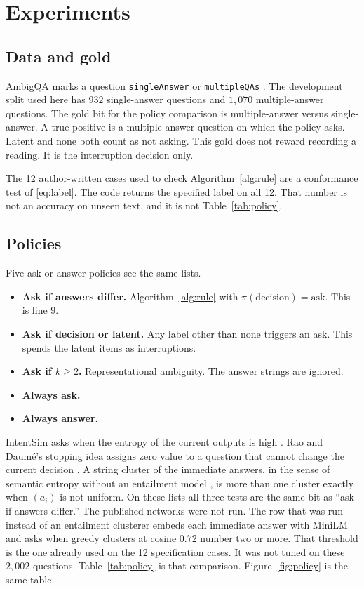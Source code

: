 \documentclass[journal]{IEEEtran}
\begin{document}
\section{Experiments}
\label{sec:eval}

\subsection{Data and gold}
AmbigQA marks a question \texttt{singleAnswer} or \texttt{multipleQAs} \cite{min-etal-2020-ambigqa}.
The development split used here has $932$ single-answer questions and $1{,}070$ multiple-answer questions.
The gold bit for the policy comparison is multiple-answer versus single-answer.
A true positive is a multiple-answer question on which the policy asks.
Latent and none both count as not asking.
This gold does not reward recording a reading.
It is the interruption decision only.

The 12 author-written cases used to check Algorithm~\ref{alg:rule} are a conformance test of \eqref{eq:label}.
The code returns the specified label on all 12.
That number is not an accuracy on unseen text, and it is not Table~\ref{tab:policy}.

\subsection{Policies}
Five ask-or-answer policies see the same lists.
\begin{itemize}
\item \textbf{Ask if answers differ.} Algorithm~\ref{alg:rule} with $\pi(\mathrm{decision})=\mathrm{ask}$. This is line 9.
\item \textbf{Ask if decision or latent.} Any label other than none triggers an ask. This spends the latent items as interruptions.
\item \textbf{Ask if $k \ge 2$.} Representational ambiguity. The answer strings are ignored.
\item \textbf{Always ask.}
\item \textbf{Always answer.}
\end{itemize}
IntentSim asks when the entropy of the current outputs is high \cite{zhang-choi-2025-clarify}.
Rao and Daum\'e's stopping idea assigns zero value to a question that cannot change the current decision \cite{rao-daume-iii-2018-learning}.
A string cluster of the immediate answers, in the sense of semantic entropy without an entailment model \cite{kuhn-etal-2023-semantic}, is more than one cluster exactly when $(a_i)$ is not uniform.
On these lists all three tests are the same bit as ``ask if answers differ.''
The published networks were not run.
The row that was run instead of an entailment clusterer embeds each immediate answer with MiniLM and asks when greedy clusters at cosine $0.72$ number two or more.
That threshold is the one already used on the 12 specification cases.
It was not tuned on these $2{,}002$ questions.
Table~\ref{tab:policy} is that comparison.
Figure~\ref{fig:policy} is the same table.
\end{document}
